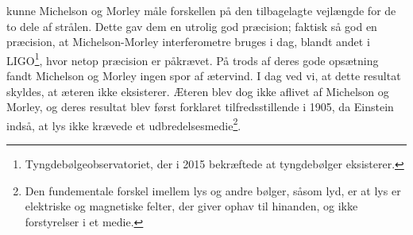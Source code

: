 kunne Michelson og Morley måle forskellen på den tilbagelagte vejlængde for de to dele af strålen. Dette gav dem en utrolig god præcision; faktisk så god en præcision, at Michelson-Morley interferometre bruges i dag, blandt andet i LIGO\footnote{Tyngdebølgeobservatoriet, der i 2015 bekræftede at tyngdebølger eksisterer.}, hvor netop præcision er påkrævet.
På trods af deres gode opsætning fandt Michelson og Morley ingen spor af ætervind.
I dag ved vi, at dette resultat skyldes, at æteren ikke eksisterer.
Æteren blev dog ikke aflivet af Michelson og Morley, og deres resultat blev først forklaret tilfredsstillende i 1905, da Einstein indså, at lys ikke krævede et udbredelsesmedie\footnote{Den fundementale forskel imellem lys og andre bølger, såsom lyd, er at lys er elektriske og magnetiske felter, der giver ophav til hinanden, og ikke forstyrelser i et medie.}.